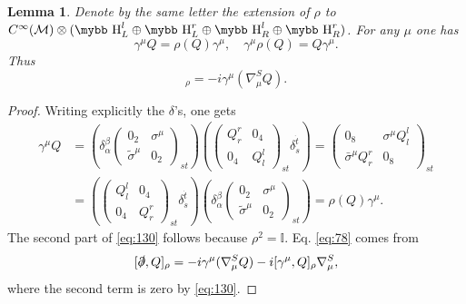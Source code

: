 \documentclass[11pt]{article}
\newcommand{\cinf}{{C^\infty({\cal M})}}
\newcommand{\ds}{\slashed \partial}
\def\bb#1{\hbox{\mybb#1}}
\newtheorem{lemma}[prop]{Lemma}
\begin{document}
\begin{lemma} 
\label{lemautomorfismo} Denote by the same letter the extension of $\rho$ to
  $\cinf\otimes (\bb H^l_L \oplus \bb H^r_L \oplus \bb H^l_R \oplus
  \bb H^r_R)$.
For any $\mu$ one has
\begin{equation}
  \label{eq:130}
  \gamma^\mu Q   = \rho(Q) \gamma^\mu,\quad \gamma^\mu\rho(Q)= Q\gamma^\mu.
\end{equation}
Thus
\begin{equation}
 [\ds,  Q]_\rho = -i\gamma^\mu (\nabla^S_\mu Q).
\label{eq:78}
 \end{equation}
\end{lemma}
\begin{proof}
 Writing explicitly the $\delta$'s, one gets
 \begin{align}
\gamma^\mu Q  &= \left(\delta_\alpha^\beta\left( \begin{array}{cc} 0_2 & \sigma^\mu \\
    \tilde\sigma^\mu & 0_2 \end{array}\right)_{st} \right) \left(\left( 
     \begin{array}{cc}
       Q^r_r & 0_4 \\ 
       0_4 & Q^l_l
     \end{array}\right)_{st} \delta_{\dot s}^{\dot t}\right)
=  \left( 
     \begin{array}{cc}
       0_8&\sigma^\mu Q_l^l \\ 
       \bar\sigma^\mu Q^r_r & 0_8
     \end{array}\right)_{st} \\ &=\left(\left( 
     \begin{array}{cc}
       Q^l_l & 0_4 \\ 
       0_4 & Q^r_r
     \end{array}\right)_{st} \delta_{\dot s}^{\dot t}\right)\left(\delta_\alpha^\beta\left( \begin{array}{cc} 0_2 & \sigma^\mu \\
    \tilde\sigma^\mu & 0_2 \end{array}\right)_{st} \right) = \rho(Q)\gamma^\mu.
\end{align}
The second part of \eqref{eq:130} follows because $\rho^2=\mathbb{I}$.
Eq. \eqref{eq:78} comes from 
\begin{equation*}
  \label{eq:79}
  [\ds, Q]_\rho =  -i\gamma^\mu(\nabla_\mu^S Q) - i[\gamma^\mu, Q]_\rho\nabla_\mu^S,
\end{equation*}
where the second term is zero by \eqref{eq:130}.\end{proof}
\end{document}
